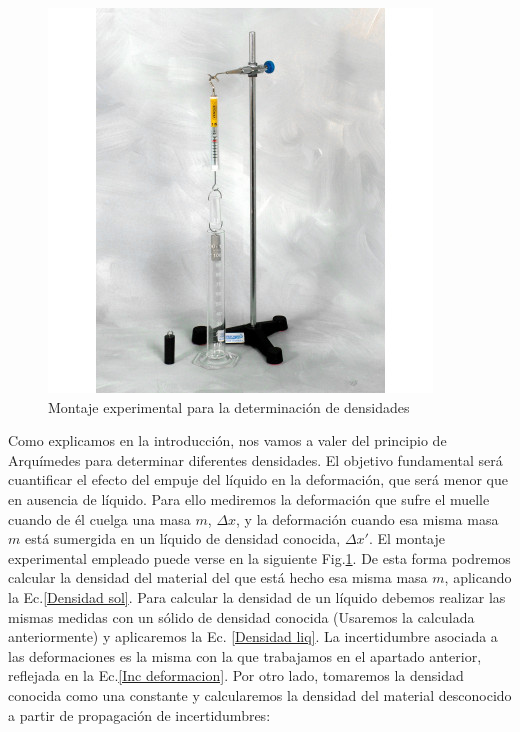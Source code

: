 \documentclass[a4paper,12pt,titlepage]{article}
\begin{document}
\begin{figure}
    \centering
    \includegraphics[width=0.95\linewidth]{Images/hooke+arquimedes.jpg}
    \caption{Montaje experimental para la determinación de densidades}
    \label{Hooke+arquimedes}
\end{figure}

Como explicamos en la introducción, nos vamos a valer del principio de Arquímedes para determinar diferentes densidades. El objetivo fundamental será cuantificar el efecto del empuje del líquido en la deformación, que será menor que en ausencia de líquido. Para ello mediremos la deformación que sufre el muelle cuando de él cuelga una masa $m$, $\Delta x$, y la deformación cuando esa misma masa $m$ está sumergida en un líquido de densidad conocida, $\Delta x'$. El montaje experimental empleado puede verse en la siguiente Fig.\ref{Hooke+arquimedes}. De esta forma podremos calcular la densidad del material del que está hecho esa misma masa $m$, aplicando la Ec.\ref{Densidad sol}. Para calcular la densidad de un líquido debemos realizar las mismas medidas con un sólido de densidad conocida (Usaremos la calculada anteriormente) y aplicaremos la Ec. \ref{Densidad liq}. La incertidumbre asociada a las deformaciones es la misma con la que trabajamos en el apartado anterior, reflejada en la Ec.\ref{Inc deformacion}. Por otro lado, tomaremos la densidad conocida como una constante y calcularemos la densidad del material desconocido a partir de propagación de incertidumbres:
\end{document}

